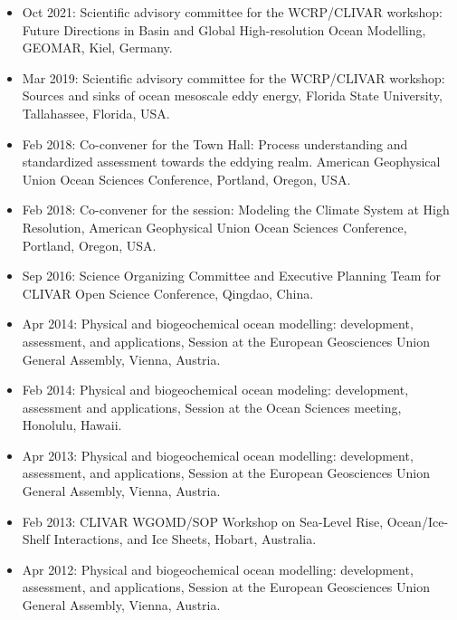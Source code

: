 \documentclass{article}
\begin{document}
\begin{itemize}[leftmargin=*]

\item Oct 2021: Scientific advisory committee for the WCRP/CLIVAR workshop: Future Directions in Basin and Global High-resolution Ocean Modelling, GEOMAR, Kiel, Germany.

\item Mar 2019: Scientific advisory committee for the WCRP/CLIVAR workshop: Sources and sinks of ocean mesoscale eddy energy, Florida State University, Tallahassee, Florida, USA. 

\item Feb 2018: Co-convener for the Town Hall: Process understanding and standardized assessment towards the eddying realm. {\sc American Geophysical Union Ocean Sciences Conference}, Portland, Oregon, USA.

\item Feb 2018: Co-convener for the session: Modeling the Climate System at High Resolution, {\sc American Geophysical Union Ocean Sciences Conference}, Portland, Oregon, USA.

\item Sep 2016: Science Organizing Committee and Executive Planning Team for {\sc CLIVAR Open Science Conference}, Qingdao, China.

\item Apr 2014: {\sc Physical and biogeochemical ocean modelling: development, assessment, and applications}, Session at the European Geosciences Union General Assembly, Vienna, Austria.

\item Feb 2014: {\sc Physical and biogeochemical ocean modeling: development, assessment and applications}, Session at the Ocean Sciences meeting, Honolulu, Hawaii.

\item Apr 2013: {\sc Physical and biogeochemical ocean modelling: development, assessment, and applications}, Session at the European Geosciences Union General Assembly, Vienna, Austria.

\item Feb 2013: {\sc CLIVAR WGOMD/SOP Workshop on Sea-Level Rise, Ocean/Ice-Shelf Interactions, and Ice Sheets}, Hobart, Australia.  

\item Apr 2012: {\sc Physical and biogeochemical ocean modelling: development, assessment, and applications}, Session at the European Geosciences Union General Assembly, Vienna, Austria.


\end{itemize}
\end{document}
